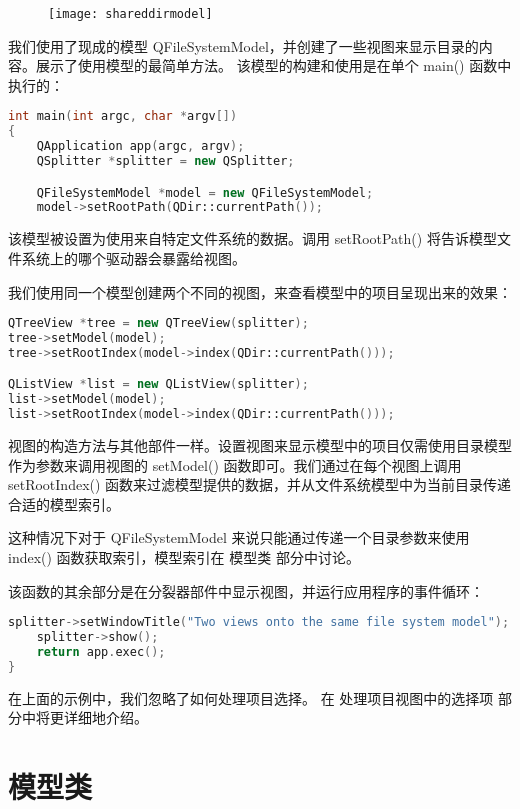 \begin{figure}[hpt!]  
	\centering
    \texttt{[image: shareddirmodel]}
\end{figure}

我们使用了现成的模型 QFileSystemModel，并创建了一些视图来显示目录的内容。展示了使用模型的最简单方法。 该模型的构建和使用是在单个 main() 函数中执行的：

\begin{lstlisting}[language=C++]
int main(int argc, char *argv[])
{
    QApplication app(argc, argv);
    QSplitter *splitter = new QSplitter;

    QFileSystemModel *model = new QFileSystemModel;
    model->setRootPath(QDir::currentPath());
\end{lstlisting}

该模型被设置为使用来自特定文件系统的数据。调用 setRootPath() 将告诉模型文件系统上的哪个驱动器会暴露给视图。

我们使用同一个模型创建两个不同的视图，来查看模型中的项目呈现出来的效果：

\begin{lstlisting}[language=C++]
QTreeView *tree = new QTreeView(splitter);
tree->setModel(model);
tree->setRootIndex(model->index(QDir::currentPath()));

QListView *list = new QListView(splitter);
list->setModel(model);
list->setRootIndex(model->index(QDir::currentPath()));
\end{lstlisting}

视图的构造方法与其他部件一样。设置视图来显示模型中的项目仅需使用目录模型作为参数来调用视图的 setModel() 函数即可。我们通过在每个视图上调用 setRootIndex() 函数来过滤模型提供的数据，并从文件系统模型中为当前目录传递合适的模型索引。

这种情况下对于 QFileSystemModel 来说只能通过传递一个目录参数来使用 index() 函数获取索引，模型索引在 模型类 部分中讨论。

该函数的其余部分是在分裂器部件中显示视图，并运行应用程序的事件循环：

\begin{lstlisting}[language=C++]
    splitter->setWindowTitle("Two views onto the same file system model");
    splitter->show();
    return app.exec();
}
\end{lstlisting}

在上面的示例中，我们忽略了如何处理项目选择。 在 处理项目视图中的选择项 部分中将更详细地介绍。

\section{模型类}

